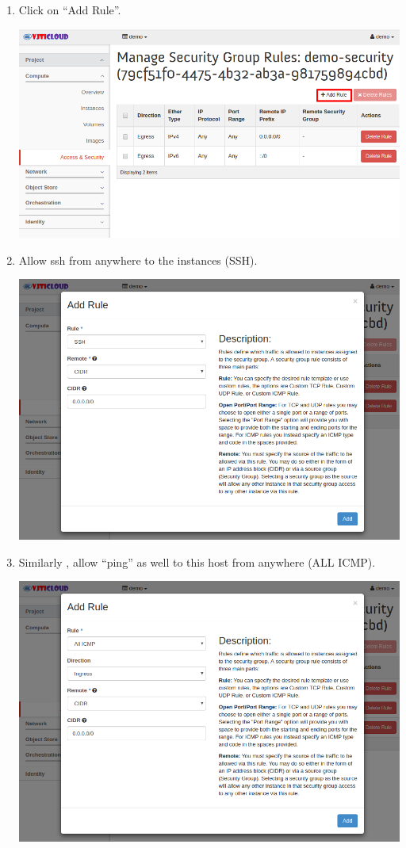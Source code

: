 \documentclass[letterpaper,10pt,english]{sphinxmanual}
\begin{document}
\begin{enumerate}
\item {} 
Click  on “Add Rule”.

\includegraphics{as-add-rule.png}

\item {} 
Allow ssh from anywhere to the instances (SSH).

\includegraphics{as-add-rule-SSH.png}

\item {} 
Similarly , allow “ping” as well to this host from anywhere (ALL ICMP).

\includegraphics{as-add-rule-PING.png}


\end{enumerate}
\end{document}
